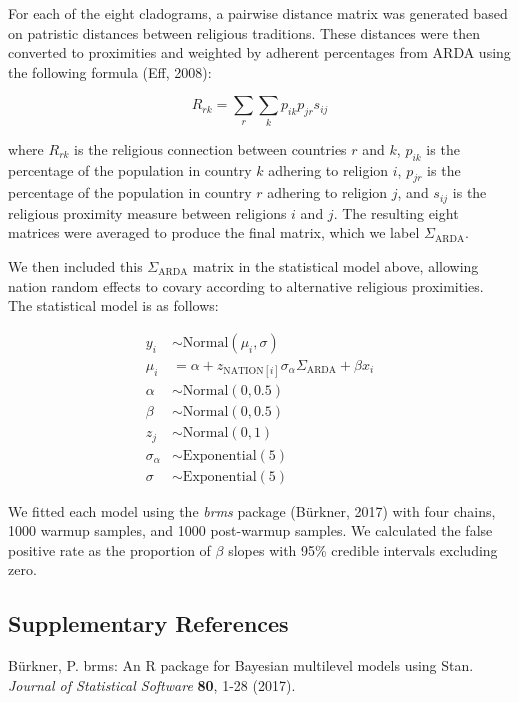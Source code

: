 \documentclass[
  11pt,
]{article}
\begin{document}
For each of the eight cladograms, a pairwise distance matrix was generated based
on patristic distances between religious traditions. These distances were then 
converted to proximities and weighted by adherent percentages from ARDA 
using the following formula (Eff, 2008):

\[R_{rk} = \sum_{r} \sum_{k} p_{ik} p_{jr} s_{ij}\]

where $R_{rk}$ is the religious connection between countries $r$ and $k$,
$p_{ik}$ is the percentage of the population in country $k$ adhering to religion
$i$, $p_{jr}$ is the percentage of the population in country $r$ adhering to 
religion $j$, and $s_{ij}$ is the religious proximity measure between religions
$i$ and $j$. The resulting eight matrices were averaged to produce the final
matrix, which we label $\Sigma_\text{ARDA}$.

We then included this $\Sigma_\text{ARDA}$ matrix in the statistical model 
above, allowing nation random effects to covary according to alternative
religious proximities. The statistical model is as follows:

\begin{align}
y_{i} &\sim \text{Normal}(\mu_{i},\sigma) \nonumber \\
\mu_{i} &= \alpha + z_{\text{NATION}[i]}\sigma_{\alpha}\Sigma_\text{ARDA} + 
\beta x_{i} \nonumber \\
\alpha &\sim \text{Normal}(0, 0.5) \nonumber \\
\beta &\sim \text{Normal}(0, 0.5) \nonumber \\
z_{j} &\sim \text{Normal}(0, 1) \nonumber \\
\sigma_{\alpha} &\sim \text{Exponential}(5) \nonumber \\
\sigma &\sim \text{Exponential}(5) \nonumber
\end{align}

We fitted each model using the \textit{brms} package (Bürkner, 2017) with four 
chains, 1000 warmup samples, and 1000 post-warmup samples. We calculated the 
false positive rate as the proportion of $\beta$ slopes with 95\% credible 
intervals excluding zero.

\subsection*{Supplementary References}

Bürkner, P. brms: An R package for Bayesian multilevel models using Stan. 
\textit{Journal of Statistical Software} \textbf{80}, 1-28 (2017).
\end{document}
